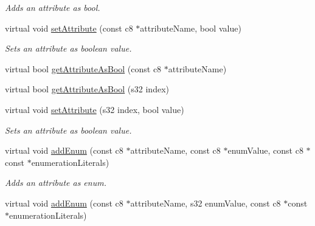 \begin{DoxyCompactItemize}
\begin{DoxyCompactList}\small\item\em Adds an attribute as bool. \end{DoxyCompactList}\item 
virtual void \hyperlink{classirr_1_1io_1_1_c_attributes_a84007861291e5b10e581d6ff327c1d23}{set\-Attribute} (const c8 $\ast$attribute\-Name, bool value)
\begin{DoxyCompactList}\small\item\em Sets an attribute as boolean value. \end{DoxyCompactList}\item 
virtual bool \hyperlink{classirr_1_1io_1_1_c_attributes_a788bcbe8e9742aced56e5c718a6b52a3}{get\-Attribute\-As\-Bool} (const c8 $\ast$attribute\-Name)
\item 
virtual bool \hyperlink{classirr_1_1io_1_1_c_attributes_a178f0b922591bec04deb082acba7ff21}{get\-Attribute\-As\-Bool} (s32 index)
\item 
\hypertarget{classirr_1_1io_1_1_c_attributes_ab790cab5b7a8ebfa44d3d2c089bcf284}{virtual void \hyperlink{classirr_1_1io_1_1_c_attributes_ab790cab5b7a8ebfa44d3d2c089bcf284}{set\-Attribute} (s32 index, bool value)}\label{classirr_1_1io_1_1_c_attributes_ab790cab5b7a8ebfa44d3d2c089bcf284}

\begin{DoxyCompactList}\small\item\em Sets an attribute as boolean value. \end{DoxyCompactList}\item 
\hypertarget{classirr_1_1io_1_1_c_attributes_a9232b0a6bee949f43446b58183ca1e5e}{virtual void \hyperlink{classirr_1_1io_1_1_c_attributes_a9232b0a6bee949f43446b58183ca1e5e}{add\-Enum} (const c8 $\ast$attribute\-Name, const c8 $\ast$enum\-Value, const c8 $\ast$const $\ast$enumeration\-Literals)}\label{classirr_1_1io_1_1_c_attributes_a9232b0a6bee949f43446b58183ca1e5e}

\begin{DoxyCompactList}\small\item\em Adds an attribute as enum. \end{DoxyCompactList}\item 
\hypertarget{classirr_1_1io_1_1_c_attributes_a0dc879b10f227f04f5348146cbb40f52}{virtual void \hyperlink{classirr_1_1io_1_1_c_attributes_a0dc879b10f227f04f5348146cbb40f52}{add\-Enum} (const c8 $\ast$attribute\-Name, s32 enum\-Value, const c8 $\ast$const $\ast$enumeration\-Literals)}\label{classirr_1_1io_1_1_c_attributes_a0dc879b10f227f04f5348146cbb40f52}


\end{DoxyCompactItemize}
